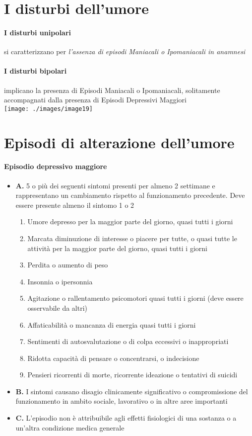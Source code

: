\section{I disturbi dell'umore}
\paragraph{I disturbi unipolari}  si caratterizzano per \emph{l'assenza di episodi Maniacali o Ipomaniacali in anamnesi} 
\paragraph{I disturbi bipolari}  implicano la presenza di Episodi Maniacali o Ipomaniacali, solitamente accompagnati dalla presenza di Episodi Depressivi Maggiori
\medskip\\
\texttt{[image: ./images/image19]}
\medskip\\
\section{Episodi di alterazione dell'umore}
\paragraph{Episodio depressivo maggiore}  
\begin{itemize}
	\item \textbf{A.} 5 o più dei seguenti sintomi presenti per almeno 2 settimane e rappresentano un cambiamento rispetto al funzionamento precedente. Deve essere presente almeno il sintomo 1 o 2
		\begin{enumerate}
			\item Umore depresso per la maggior parte del giorno, quasi tutti i giorni
			\item Marcata diminuzione di interesse o piacere per tutte, o quasi tutte le attività per la maggior parte del giorno, quasi tutti i giorni
			\item Perdita o aumento di peso
			\item Insonnia o ipersonnia
			\item Agitazione o rallentamento psicomotori quasi tutti i giorni (deve essere osservabile da altri)
			\item Affaticabilità o mancanza di energia quasi tutti i giorni
			\item Sentimenti di autosvalutazione o di colpa eccessivi o inappropriati
			\item Ridotta capacità di pensare o concentrarsi, o indecisione
			\item Pensieri ricorrenti di morte, ricorrente ideazione o tentativi di suicidi
		\end{enumerate}
	\item \textbf{B.}  I sintomi causano disagio clinicamente significativo o compromissione del funzionamento in ambito sociale, lavorativo o in altre aree importanti
	\item \textbf{C.} L'episodio non è attribuibile agli effetti fisiologici di una sostanza o a un'altra condizione medica generale
\end{itemize}
